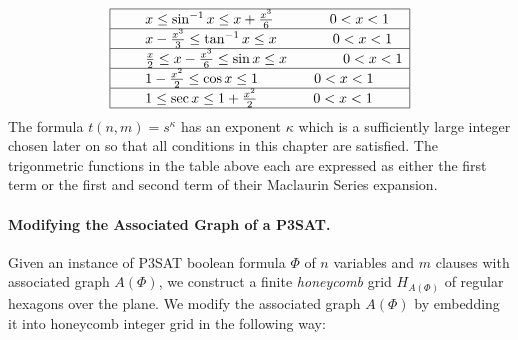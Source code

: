 \documentclass[10pt]{CSUNthesis}
\theoremstyle{plain}%
\theoremstyle{definition}
\theoremstyle{remark}
\newcommand{\lr}[1]{\left( #1 \right)}
\begin{document}
$$
\begin{array}{|rcl|}
\hline
&& x 				\leq \sin^{-1} x \leq x + \frac{x^3}{6} \qquad\qquad 0< x <1 \\\hline
&& x - \frac{x^3}{3}\leq \tan^{-1} x \leq x 				\qquad\qquad 0< x < 1\\\hline
&& \frac{x}{2}\leq x - \frac{x^3}{6}\leq \sin x 	 \leq x 				\qquad\qquad 0< x < 1\\\hline
&& 1 - \frac{x^2}{2}\leq \cos x 	 \leq 1 				\qquad\qquad 0< x < 1\\\hline
&& 1 				\leq \sec x 	 \leq 1 + \frac{x^2}{2} \qquad\qquad 0< x < 1\\\hline
\end{array}
$$
The formula $t(n,m)=s^\kappa$ has an exponent $\kappa$ which is a sufficiently large integer chosen later on so that all conditions in this chapter are satisfied.
The trigonmetric functions in the table above each are expressed as either the first term or the first and second term of their Maclaurin Series expansion.

\paragraph{Modifying the Associated Graph of a P3SAT.}

Given an instance of P3SAT boolean formula $\Phi$ of $n$ variables and $m$ clauses with associated graph $A(\Phi)$, we construct a finite \textit{honeycomb} grid $H_{A \lr{\Phi}}$ of regular hexagons over the plane.
We modify the associated graph $A\lr{\Phi}$ by embedding it into honeycomb integer grid in the following way:
\end{document}
